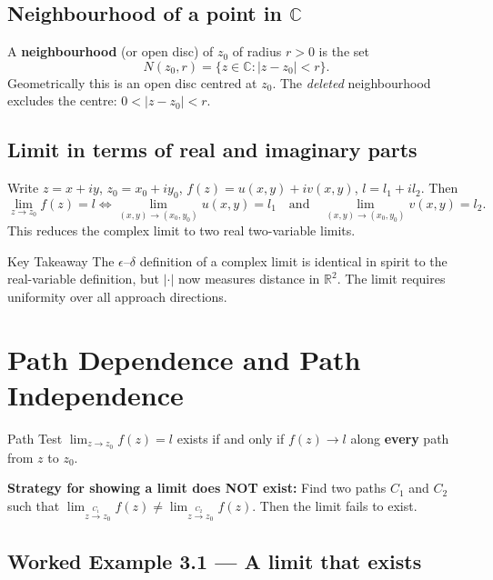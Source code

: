 \documentclass[12pt,a4paper]{article}
\begin{document}
\subsection*{Neighbourhood of a point in \texorpdfstring{$\mathbb{C}$}{C}}

A \textbf{neighbourhood} (or open disc) of $z_0$ of radius $r > 0$ is the set
\[
  N(z_0, r) = \{ z \in \mathbb{C} : |z - z_0| < r \}.
\]
Geometrically this is an open disc centred at $z_0$.  The \emph{deleted}
neighbourhood excludes the centre: $0 < |z - z_0| < r$.

\subsection*{Limit in terms of real and imaginary parts}

Write $z = x + iy$, $z_0 = x_0 + iy_0$, $f(z) = u(x,y) + iv(x,y)$,
$l = l_1 + il_2$.  Then
\[
  \lim_{z \to z_0} f(z) = l
  \iff
  \lim_{(x,y)\to(x_0,y_0)} u(x,y) = l_1
  \quad\text{and}\quad
  \lim_{(x,y)\to(x_0,y_0)} v(x,y) = l_2.
\]
This reduces the complex limit to two real two-variable limits.

\begin{learnbox}{Key Takeaway}
The $\epsilon$--$\delta$ definition of a complex limit is identical in spirit to
the real-variable definition, but $|\cdot|$ now measures distance in $\mathbb{R}^2$.
The limit requires uniformity over all approach directions.
\end{learnbox}

\section{Path Dependence and Path Independence}

\begin{infobox}{Path Test}
$\lim_{z \to z_0} f(z) = l$ exists if and only if $f(z) \to l$ along
\textbf{every} path from $z$ to $z_0$.

\medskip
\textbf{Strategy for showing a limit does NOT exist:}
Find two paths $C_1$ and $C_2$ such that
$\lim_{z \overset{C_1}{\to} z_0} f(z) \neq \lim_{z \overset{C_2}{\to} z_0} f(z)$.
Then the limit fails to exist.
\end{infobox}

\subsection*{Worked Example 3.1 --- A limit that exists}
\end{document}
